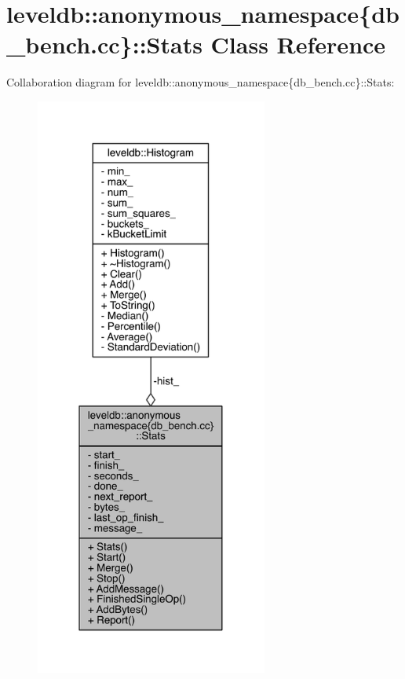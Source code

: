 \hypertarget{classleveldb_1_1anonymous__namespace_02db__bench_8cc_03_1_1_stats}{}\section{leveldb\+:\+:anonymous\+\_\+namespace\{db\+\_\+bench.\+cc\}\+:\+:Stats Class Reference}
\label{classleveldb_1_1anonymous__namespace_02db__bench_8cc_03_1_1_stats}


Collaboration diagram for leveldb\+:\+:anonymous\+\_\+namespace\{db\+\_\+bench.\+cc\}\+:\+:Stats\+:
\nopagebreak
\begin{figure}[H]
\begin{center}
\leavevmode
\includegraphics[width=217pt]{classleveldb_1_1anonymous__namespace_02db__bench_8cc_03_1_1_stats__coll__graph}
\end{center}
\end{figure}
